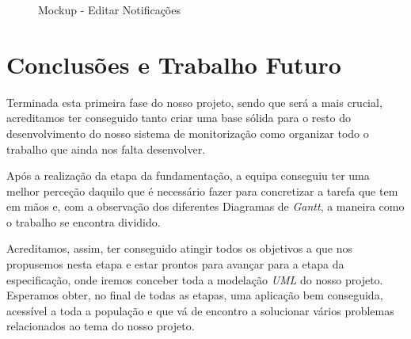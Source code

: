 \documentclass[a4paper,12pt]{scrreprt}
\newcommand{\tab}{
    \hspace{1cm}}
\begin{document}
\begin{figure}[hbt!]
    \centering
    \caption{Mockup - Editar Notificações}
\end{figure}
\clearpage

\chapter{Conclusões e Trabalho Futuro}
\tab Terminada esta primeira fase do nosso projeto, sendo que será a mais crucial, acreditamos ter conseguido tanto criar uma base sólida para o resto do desenvolvimento do nosso sistema de monitorização como organizar todo o trabalho que ainda nos falta desenvolver.
    
\tab Após a realização da etapa da fundamentação, a equipa conseguiu ter uma melhor perceção daquilo que é necessário fazer para concretizar a tarefa que tem em mãos e, com a observação dos diferentes Diagramas de \textit{Gantt}, a maneira como o trabalho se encontra dividido.
    
\tab Acreditamos, assim, ter conseguido atingir todos os objetivos a que nos propusemos nesta etapa e estar prontos para avançar para a etapa da especificação, onde iremos conceber toda a modelação \textit{UML} do nosso projeto. Esperamos obter, no final de todas as etapas, uma aplicação bem conseguida, acessível a toda a população e que vá de encontro a solucionar vários problemas relacionados ao tema do nosso projeto.
\end{document}
